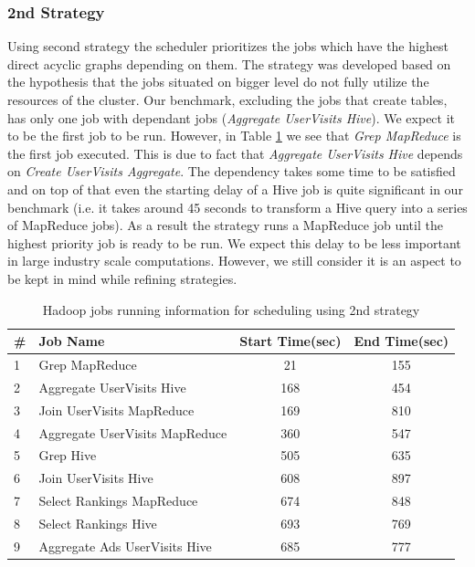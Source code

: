 \documentclass[11pt,a4paper,twoside]{report}
\begin{document}
\subsubsection{2nd Strategy}
Using second strategy the scheduler prioritizes the jobs which have the highest direct acyclic graphs depending on them. The strategy was developed based on the hypothesis that the jobs situated on bigger level do not fully utilize the resources of the cluster. Our benchmark, excluding the jobs that create tables, has only one job with dependant jobs (\textit{Aggregate UserVisits Hive}). We expect it to be the first job to be run. However, in Table \ref{tab:DronTest2Jobs} we see that \textit{Grep MapReduce} is the first job executed. This is due to fact that \textit{Aggregate UserVisits Hive} depends on \textit{Create UserVisits Aggregate}. The dependency takes some time to be satisfied and on top of that even the starting delay of a Hive job is quite significant in our benchmark (i.e. it takes around 45 seconds to transform a Hive query into a series of MapReduce jobs). As a result the strategy runs a MapReduce job until the highest priority job is ready to be run. We expect this delay to be less important in large industry scale computations. However, we still consider it is an aspect to be kept in mind while refining strategies.


\begin{table}[h]
\centering
\begin{tabular}{|l|l|c|c|}
\hline
\textbf{\#} & \textbf{Job Name} & \textbf{Start Time(sec)} & \textbf{End Time(sec)} \\ \hline
1 & Grep MapReduce & 21 & 155 \\ \hline
2 & Aggregate UserVisits Hive & 168 & 454  \\ \hline
3 & Join UserVisits MapReduce & 169 & 810 \\ \hline
4 & Aggregate UserVisits MapReduce & 360 & 547 \\ \hline
5 & Grep Hive & 505 & 635 \\ \hline
6 & Join UserVisits Hive & 608 & 897 \\ \hline
7 & Select Rankings MapReduce & 674 & 848 \\ \hline
8 & Select Rankings Hive & 693 & 769 \\ \hline 
9 & Aggregate Ads UserVisits Hive & 685 & 777 \\ \hline
\end{tabular}
\caption{Hadoop jobs running information for scheduling using 2nd strategy}
\label{tab:DronTest2Jobs}
\end{table}
\end{document}
